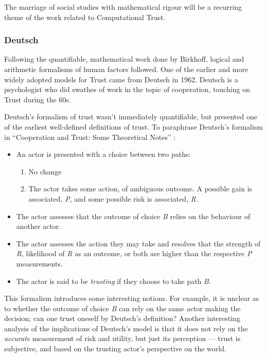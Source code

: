 The marriage of social studies with mathematical rigour will be a recurring theme of the work related to Computational Trust.\par

\subsubsection{Deutsch}
Following the quantifiable, mathematical work done by Birkhoff, logical and arithmetic formalisms of human factors followed. One of the earlier and more widely adopted models for Trust came from Deutsch in 1962. 
Deutsch is a psychologist who did swathes of work in the topic of cooperation, touching on Trust during the 60s. \par

Deutsch's formalism of trust wasn't immediately quantifiable, but presented one of the earliest well-defined definitions of trust. To paraphrase Deutsch's formalism in ``Cooperation and Trust: Some Theoretical Notes'' \parencite{deutsch1962cooperation}:
\begin{itemize}
    \item An actor is presented with a choice between two paths:
    \begin{enumerate}[label=\emph{\Alph*}:]
        \item No change
        \item The actor takes some action, of ambiguous outcome. A possible gain is associated, \emph{P}, and some possible risk is associated, \emph{R}.
    \end{enumerate}
    \item The actor assesses that the outcome of choice \emph{B} relies on the behaviour of another actor.
    \item The actor assesses the action they may take and resolves that the strength of \emph{R}, likelihood of \emph{R} as an outcome, or both are higher than the respective \emph{P} measurements.
    \item The actor is said to be \emph{trusting} if they choose to take path \emph{B}.
\end{itemize}

This formalism introduces some interesting notions. For example, it is unclear as to whether the outcome of choice \emph{B} can rely on the same actor making the decision; can one trust oneself by Deutsch's definition? Another interesting analysis of the implications of Deutsch's model is that it does not rely on the \emph{accurate} measurement of risk and utility, but just its perception --- trust is subjective, and based on the trusting actor's perspective on the world.


